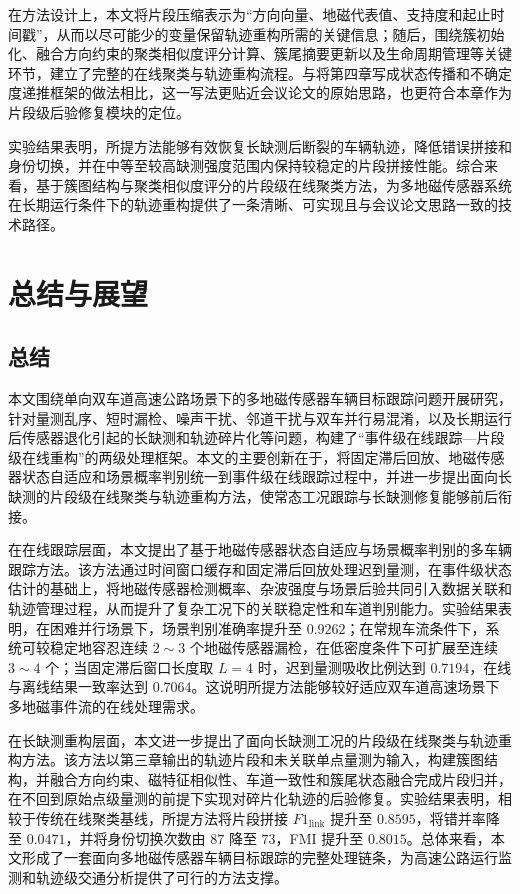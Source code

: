 \documentclass{xdupgthesis}
\begin{document}
在方法设计上，本文将片段压缩表示为“方向向量、地磁代表值、支持度和起止时间戳”，从而以尽可能少的变量保留轨迹重构所需的关键信息；随后，围绕簇初始化、融合方向约束的聚类相似度评分计算、簇尾摘要更新以及生命周期管理等关键环节，建立了完整的在线聚类与轨迹重构流程。与将第四章写成状态传播和不确定度递推框架的做法相比，这一写法更贴近会议论文的原始思路，也更符合本章作为片段级后验修复模块的定位。

实验结果表明，所提方法能够有效恢复长缺测后断裂的车辆轨迹，降低错误拼接和身份切换，并在中等至较高缺测强度范围内保持较稳定的片段拼接性能。综合来看，基于簇图结构与聚类相似度评分的片段级在线聚类方法，为多地磁传感器系统在长期运行条件下的轨迹重构提供了一条清晰、可实现且与会议论文思路一致的技术路径。



\chapter{总结与展望}

\section{总结}

本文围绕单向双车道高速公路场景下的多地磁传感器车辆目标跟踪问题开展研究，针对量测乱序、短时漏检、噪声干扰、邻道干扰与双车并行易混淆，以及长期运行后传感器退化引起的长缺测和轨迹碎片化等问题，构建了“事件级在线跟踪—片段级在线重构”的两级处理框架。本文的主要创新在于，将固定滞后回放、地磁传感器状态自适应和场景概率判别统一到事件级在线跟踪过程中，并进一步提出面向长缺测的片段级在线聚类与轨迹重构方法，使常态工况跟踪与长缺测修复能够前后衔接。

在在线跟踪层面，本文提出了基于地磁传感器状态自适应与场景概率判别的多车辆跟踪方法。该方法通过时间窗口缓存和固定滞后回放处理迟到量测，在事件级状态估计的基础上，将地磁传感器检测概率、杂波强度与场景后验共同引入数据关联和轨迹管理过程，从而提升了复杂工况下的关联稳定性和车道判别能力。实验结果表明，在困难并行场景下，场景判别准确率提升至 $0.9262$；在常规车流条件下，系统可较稳定地容忍连续 $2\sim3$ 个地磁传感器漏检，在低密度条件下可扩展至连续 $3\sim4$ 个；当固定滞后窗口长度取 $L=4$ 时，迟到量测吸收比例达到 $0.7194$，在线与离线结果一致率达到 $0.7064$。这说明所提方法能够较好适应双车道高速场景下多地磁事件流的在线处理需求。

在长缺测重构层面，本文进一步提出了面向长缺测工况的片段级在线聚类与轨迹重构方法。该方法以第三章输出的轨迹片段和未关联单点量测为输入，构建簇图结构，并融合方向约束、磁特征相似性、车道一致性和簇尾状态融合完成片段归并，在不回到原始点级量测的前提下实现对碎片化轨迹的后验修复。实验结果表明，相较于传统在线聚类基线，所提方法将片段拼接 $F1_{\mathrm{link}}$ 提升至 $0.8595$，将错并率降至 $0.0471$，并将身份切换次数由 $87$ 降至 $73$，FMI 提升至 $0.8015$。总体来看，本文形成了一套面向多地磁传感器车辆目标跟踪的完整处理链条，为高速公路运行监测和轨迹级交通分析提供了可行的方法支撑。
\end{document}
